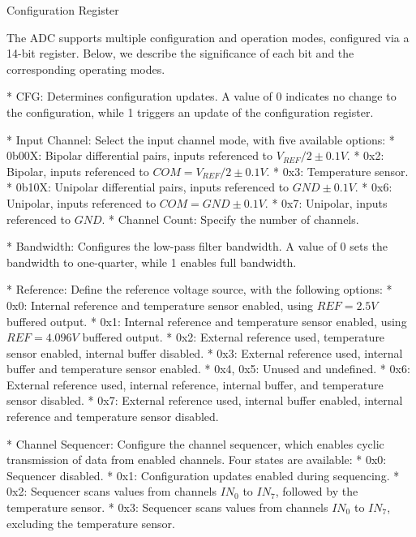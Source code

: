 \secc Configuration Register

The ADC supports multiple configuration and operation modes, configured via a 14-bit register. Below, we describe the significance of each bit and the corresponding operating modes.

\begitems
* {\sbf [13] CFG}: Determines configuration updates. A value of 0 indicates no change to the configuration, while 1 triggers an update of the configuration register.

* {\sbf [12:10] Input Channel}: Select the input channel mode, with five available options:
    \begitems
    * {0b00X}: Bipolar differential pairs, inputs referenced to $V_{REF}/2 \pm 0.1 {V}$.
    * 0x2: Bipolar, inputs referenced to $COM = V_{REF}/2 \pm 0.1 {V}$.
    * 0x3: Temperature sensor.
    * {0b10X}: Unipolar differential pairs, inputs referenced to $GND \pm 0.1 {V}$.
    * 0x6: Unipolar, inputs referenced to $COM = GND \pm 0.1 {V}$.
    * 0x7: Unipolar, inputs referenced to $GND$.
    \enditems
* {\sbf [9:7] Channel Count}: Specify the number of channels.

* {\sbf [6] Bandwidth}: Configures the low-pass filter bandwidth. A value of 0 sets the bandwidth to one-quarter, while 1 enables full bandwidth.

* {\sbf [5:3] Reference}: Define the reference voltage source, with the following options:
    \begitems
    * 0x0: Internal reference and temperature sensor enabled, using $REF = 2.5 {V}$ buffered output.
    * 0x1: Internal reference and temperature sensor enabled, using $REF = 4.096 {V}$ buffered output.
    * 0x2: External reference used, temperature sensor enabled, internal buffer disabled.
    * 0x3: External reference used, internal buffer and temperature sensor enabled.
    * 0x4, 0x5: Unused and undefined.
    * 0x6: External reference used, internal reference, internal buffer, and temperature sensor disabled.
    * 0x7: External reference used, internal buffer enabled, internal reference and temperature sensor disabled.
    \enditems

* {\sbf [2:1] Channel Sequencer}: Configure the channel sequencer, which enables cyclic transmission of data from enabled channels. Four states are available:
    \begitems
    * 0x0: Sequencer disabled.
    * 0x1: Configuration updates enabled during sequencing.
    * 0x2: Sequencer scans values from channels $IN_0$ to $IN_7$, followed by the temperature sensor.
    * 0x3: Sequencer scans values from channels $IN_0$ to $IN_7$, excluding the temperature sensor.
    \enditems

